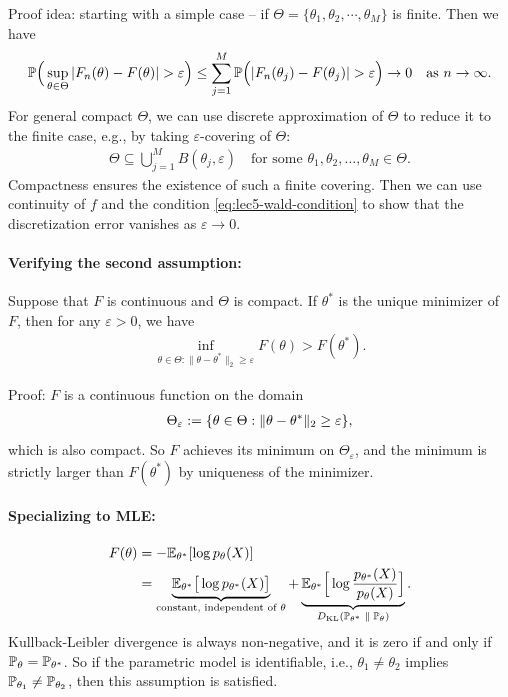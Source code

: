 \documentclass[11pt,letterpaper]{article}
\numberwithin{assumption}{lecture}
\numberwithin{theorem}{lecture}
\numberwithin{proposition}{lecture}
\numberwithin{lemma}{lecture}
\numberwithin{claim}{lecture}
\numberwithin{corollary}{lecture}
\numberwithin{definition}{lecture}
\numberwithin{conjecture}{lecture}
\numberwithin{remark}{lecture}
\numberwithin{example}{lecture}
\numberwithin{equation}{lecture}
\begin{document}
Proof idea: starting with a simple case -- if $\Theta = \{\theta_1, \theta_2, \cdots, \theta_M\}$ is finite. Then we have
\begin{align*}
  {\mathbb{P}} \Big( \sup_{\theta \in \Theta} |F_n (\theta) - F(\theta)| > \varepsilon \Big) \leq \sum_{j=1}^M {\mathbb{P}} \Big( |F_n (\theta_j) - F(\theta_j)| > \varepsilon \Big) \to 0 \quad \text{as } n \to \infty.
\end{align*}
For general compact $\Theta$, we can use discrete approximation of $\Theta$ to reduce it to the finite case, e.g., by taking $\varepsilon$-covering of $\Theta$:
\begin{align*}
  \Theta \subseteq \bigcup_{j=1}^M B(\theta_j, \varepsilon) \quad \text{for some } \theta_1, \theta_2, \ldots, \theta_M \in \Theta.
\end{align*}
Compactness ensures the existence of such a finite covering. Then we can use continuity of $f$ and the condition \eqref{eq:lec5-wald-condition} to show that the discretization error vanishes as $\varepsilon \to 0$.

\paragraph{Verifying the second assumption:}
\begin{proposition}
 Suppose that $F$ is continuous and $\Theta$ is compact. If $\theta^*$ is the unique minimizer of $F$, then for any $\varepsilon > 0$, we have
  \begin{align*}
    \inf_{\theta \in \Theta: \|\theta - \theta^*\|_2 \geq \varepsilon} F(\theta) > F(\theta^*).
  \end{align*}
\end{proposition}
Proof: $F$ is a continuous function on the domain
\begin{align*}
  \Theta_\varepsilon := \{\theta \in \Theta: \|\theta - \theta^*\|_2 \geq \varepsilon\},
\end{align*}
which is also compact. So $F$ achieves its minimum on $\Theta_\varepsilon$, and the minimum is strictly larger than $F(\theta^*)$ by uniqueness of the minimizer.

\paragraph{Specializing to MLE:}
\begin{align*}
  F (\theta) &= - {\mathbb{E}}_{\theta^*} [\log p_\theta (X)]\\
  &= \underbrace{{\mathbb{E}}_{\theta^*} \big[ \log p_{\theta^*} (X) \big]}_{\text{constant, independent of $\theta$}} + \underbrace{{\mathbb{E}}_{\theta^*} \Big[ \log \frac{p_{\theta^*} (X)}{p_\theta (X)} \Big]}_{D_{\text{KL}}({\mathbb{P}}_{\theta^*}\; \| \; {\mathbb{P}}_\theta)}.
\end{align*}
Kullback-Leibler divergence is always non-negative, and it is zero if and only if ${\mathbb{P}}_\theta = {\mathbb{P}}_{\theta^*}$. So if the parametric model is identifiable, i.e., $\theta_1 \neq \theta_2$ implies ${\mathbb{P}}_{\theta_1} \neq {\mathbb{P}}_{\theta_2}$, then this assumption is satisfied.
\end{document}
